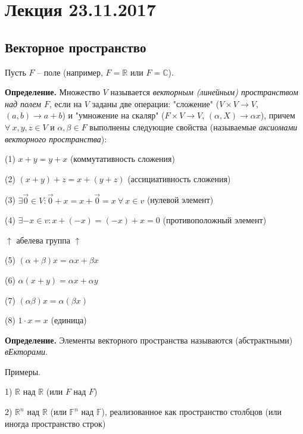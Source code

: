 \section{Лекция 23.11.2017}

\subsection{Векторное пространство}

\vspace{\baselineskip}
Пусть $F$ -- поле (например, $F = \mathbb{R}$ или $F = \mathbb{C}$).

\vspace{\baselineskip}
\textbf{Определение.} Множество $V$ называется \textit{векторным (линейным) пространством над полем $F$}, если на $V$ заданы две операции: "сложение" ($V \times V \rightarrow V$, $(a,b) \rightarrow a+b$) и "умножение на скаляр" ($F \times V \rightarrow V$, $(\alpha, X) \rightarrow \alpha x$), причем $\forall \ x, y, z \in V$ и $\alpha, \beta \in F$ выполнены следующие свойства (называемые \textit{аксиомами векторного пространства}):

(1) $x + y = y + x$ (коммутативность сложения)

(2) $(x+y)+z = x+(y+z)$ (ассициативность сложения)

(3) $\exists \overrightarrow{0} \in V: \overrightarrow{0} + x = x + \overrightarrow{0} = x \ \forall \ x \in v$ (нулевой элемент)

(4) $\exists -x \in v: x+(-x)=(-x)+x=0$ (противоположный элемент)

$\uparrow$ абелева группа $\uparrow$

(5) $(\alpha + \beta) x = \alpha x + \beta x$

(6) $\alpha (x + y) = \alpha x + \alpha y$

(7) $(\alpha \beta) x  = \alpha (\beta x)$

(8) $ 1 \cdot x = x $ (единица)

\vspace{\baselineskip}
\textbf{Определение.} Элементы векторного пространства называются (абстрактными) \textit{вЕкторами}.

\vspace{\baselineskip}
Примеры. 

1) $\mathbb{R}$ над $\mathbb{R}$ (или $F$ над $F$)

2) $\mathbb{R}^n$ над $\mathbb{R}$ (или $\mathbb{F}^n$ над $\mathbb{F}$), реализованное как пространство столбцов (или иногда пространство строк)

